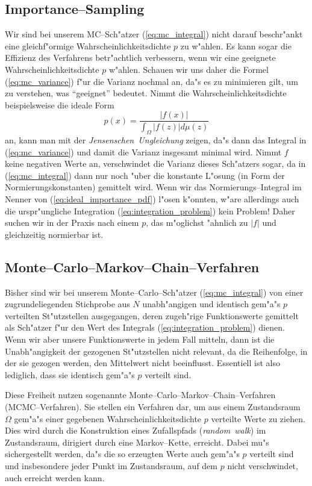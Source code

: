 \documentclass[11pt,a4paper,DIVcalc,BCOR8mm,titlepage,twoside]{scrartcl}
\begin{document}
	\subsection{Importance--Sampling}
	Wir sind bei unserem MC--Sch"atzer (\ref{eq:mc_integral}) nicht darauf beschr"ankt eine gleich\-f"or\-mi\-ge Wahrscheinlichkeitsdichte $p$ zu w"ahlen. Es kann sogar die Effizienz des Verfahrens betr"achtlich verbessern, wenn wir eine geeignete Wahrscheinlichkeitsdichte $p$ w"ahlen. Schauen wir uns daher die Formel (\ref{eq:mc_variance}) f"ur die Varianz nochmal an, da"s es zu minimieren gilt, um zu verstehen, was ``geeignet'' bedeutet. Nimmt die Wahrscheinlichkeitsdichte beispielsweise die ideale Form
	\begin{equation}
		p(x)=\frac{|f(x)|}{\int_\Omega |f(z)|d\mu(z)}
		\label{eq:ideal_importance_pdf}
	\end{equation}
	an, kann man mit der {\em Jensenschen~Ungleichung} zeigen, da"s dann das Integral in (\ref{eq:mc_variance}) und damit die Varianz insgesamt minimal wird. Nimmt $f$ keine negativen Werte an, verschwindet die Varianz dieses Sch"atzers sogar, da in (\ref{eq:mc_integral}) dann nur noch "uber die konstante L"osung (in Form der Normierungskonstanten) gemittelt wird. Wenn wir das Normierungs--Integral im Nenner von (\ref{eq:ideal_importance_pdf}) l"osen k"onnten, w"are allerdings auch die urspr"ungliche Integration (\ref{eq:integration_problem}) kein Problem! Daher suchen wir in der Praxis nach einem $p$, das m"oglichst "ahnlich zu $|f|$ und gleichzeitig normierbar ist.
	
	
	\subsection{Monte--Carlo--Markov--Chain--Verfahren}
	Bisher sind wir bei unserem Monte--Carlo--Sch"atzer (\ref{eq:mc_integral}) von einer zugrundeliegenden Stichprobe aus $N$ unabh"angigen und identisch gem"a"s $p$ verteilten St"utzstellen ausgegangen, deren zugeh"rige Funktionswerte gemittelt als Sch"atzer f"ur den Wert des Integrals (\ref{eq:integration_problem}) dienen. Wenn wir aber unsere Funktionswerte in jedem Fall mitteln, dann ist die Unabh"angigkeit der gezogenen St"utzstellen nicht relevant, da die Reihenfolge, in der sie gezogen werden, den Mittelwert nicht beeinflusst. Essentiell ist also lediglich, dass sie identisch gem"a"s $p$ verteilt sind.
	
	Diese Freiheit nutzen sogenannte Monte--Carlo--Markov--Chain--Verfahren (MCMC--Verfahren). Sie stellen ein Verfahren dar, um aus einem Zustandsraum $\Omega$ gem"a"s einer gegebenen Wahrscheinlichkeitsdichte $p$ verteilte Werte zu ziehen. Dies wird durch die Konstruktion eines Zufallspfads ({\em random~walk}) im Zustandsraum, dirigiert durch eine Markov--Kette, erreicht. Dabei mu"s sichergestellt werden, da"s die so erzeugten Werte auch gem"a"s $p$ verteilt sind und insbesondere jeder Punkt im Zustandsraum, auf dem $p$ nicht verschwindet, auch erreicht werden kann.
	
\end{document}

